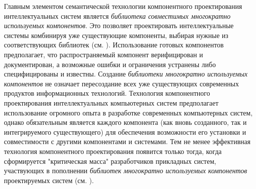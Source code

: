 Главным элементом семантической технологии компонентного проектирования интеллектуальных систем является \textit{библиотека совместимых многократно используемых компонентов}. Это позволяет проектировать интеллектуальные системы комбинируя уже существующие компоненты, выбирая нужные из соответствующих библиотек (см. ). Использование готовых компонентов предполагает, что распространяемый компонент верифицирован и документирован, а возможные ошибки и ограничения устранены либо специфицированы и известны. Создание \textit{библиотеки многократно используемых компонентов} не означает пересоздание всех уже существующих современных продуктов информационных технологий. Технология компонентного проектирования интеллектуальных компьютерных систем предполагает использование огромного опыта в разработке современных компьютерных систем, однако обязательным является  каждого компонента (как вновь созданного, так и интегрируемого существующего) для обеспечения возможности его установки и совместимости с другими компонентами и системами. Тем не менее эффективная технология компонентного проектирования появится только тогда, когда сформируется "критическая масса"{} разработчиков прикладных систем, участвующих в пополнении \textit{библиотек многократно используемых компонентов} проектируемых систем (см. ).

